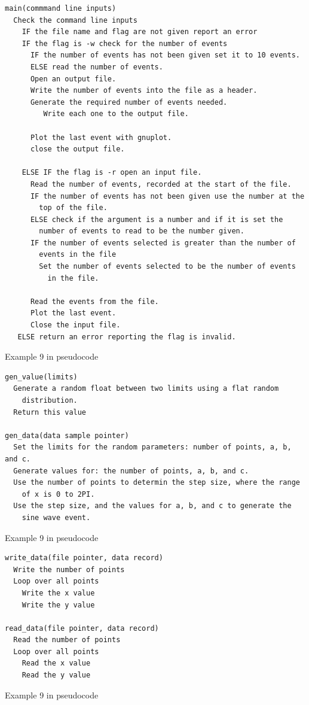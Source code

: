 \documentclass[11pt]{scrartcl}
\begin{document}
\begin{pseudocode}[h]
\begin{verbatim}
main(commmand line inputs)
  Check the command line inputs
    IF the file name and flag are not given report an error
    IF the flag is -w check for the number of events
      IF the number of events has not been given set it to 10 events.
      ELSE read the number of events.
      Open an output file.
      Write the number of events into the file as a header.
      Generate the required number of events needed.
         Write each one to the output file.
    
      Plot the last event with gnuplot.
      close the output file.

    ELSE IF the flag is -r open an input file.
      Read the number of events, recorded at the start of the file.
      IF the number of events has not been given use the number at the
        top of the file.
      ELSE check if the argument is a number and if it is set the
        number of events to read to be the number given.
      IF the number of events selected is greater than the number of
        events in the file
        Set the number of events selected to be the number of events 
          in the file. 

      Read the events from the file.
      Plot the last event.
      Close the input file.
   ELSE return an error reporting the flag is invalid.
\end{verbatim}
\caption{Example 9 in pseudocode \label{pseudo:ex9_main}}
\end{pseudocode}

\begin{pseudocode}[h]
\begin{verbatim}
gen_value(limits)
  Generate a random float between two limits using a flat random
    distribution. 
  Return this value

gen_data(data sample pointer)
  Set the limits for the random parameters: number of points, a, b, and c.
  Generate values for: the number of points, a, b, and c.
  Use the number of points to determin the step size, where the range
    of x is 0 to 2PI.
  Use the step size, and the values for a, b, and c to generate the
    sine wave event.
\end{verbatim}
\caption{Example 9 in pseudocode \label{pseudo:ex9_gen_data}}
\end{pseudocode}

\begin{pseudocode}[h]
\begin{verbatim}
write_data(file pointer, data record)
  Write the number of points
  Loop over all points
    Write the x value
    Write the y value

read_data(file pointer, data record)
  Read the number of points
  Loop over all points
    Read the x value
    Read the y value
\end{verbatim}
\caption{Example 9 in pseudocode \label{pseudo:ex9_file_io}}
\end{pseudocode}
\end{document}
